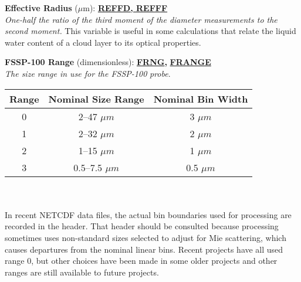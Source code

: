 \begin{hangparagraphs}
\textbf{Effective Radius }($\mu$m): \textbf{\uline{REFFD}}\textbf{\uline{,
REFFF}}\\
\emph{One-half the ratio of the third moment
of the diameter measurements to the second moment.} This variable
is useful in some calculations that relate the liquid water content
of a cloud layer to its optical properties.\\

\textbf{FSSP-100 Range }(dimensionless):\textbf{
}\textbf{\uline{FRNG}}\textbf{,
}\textbf{\uline{FRANGE}}\\
\emph{The size range in use for the FSSP-100}
\emph{probe}.

\begin{minipage}[t]{0.9\textwidth}%
\hspace*{0.7in}%
\begin{tabular}{|c|c|c|}
\hline 
Range & \textbf{Nominal Size Range} & \textbf{Nominal Bin Width}\tabularnewline
\hline 
\hline 
0 & 2--47 $\mu m$ & 3 $\mu m$\tabularnewline
\hline 
1 & 2--32 $\mu m$ & 2 $\mu m$\tabularnewline
\hline 
2 & 1--15 $\mu m$ & 1 $\mu m$\tabularnewline
\hline 
3 & 0.5--7.5 $\mu m$ & 0.5 $\mu m$\tabularnewline
\hline 
\end{tabular}%
\end{minipage}\\
\\
In recent NETCDF data files, the actual bin boundaries used for processing
are recorded in the header. That header should be consulted because
processing sometimes uses non-standard sizes selected to adjust for
Mie scattering, which causes departures from the nominal linear bins.
Recent projects have all used range 0, but other choices have been
made in some older projects and other ranges are still available to
future projects.
\end{hangparagraphs}


